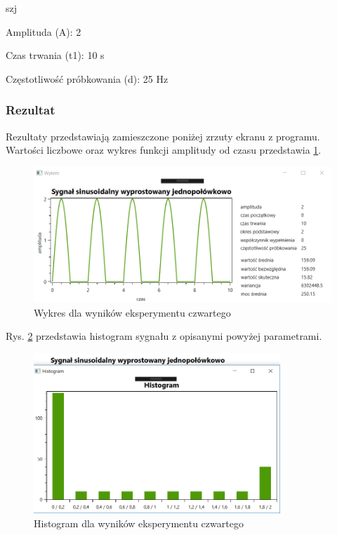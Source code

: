 \documentclass[12pt]{article}
\begin{document}
\begin{labeling}{szj}
\item [Amplituda (A):] 2
\item [Czas trwania (t1):] 10 s
\item [Częstotliwość próbkowania (d): ] 25 Hz
\end{labeling}

\subsubsection{Rezultat}

Rezultaty przedstawiają zamieszczone poniżej zrzuty ekranu z programu. Wartości liczbowe oraz wykres funkcji amplitudy od czasu przedstawia \ref{Wykres dla wyników eksperymentu czwartego}.
\begin{figure}[h!]
 \centering
 \includegraphics[width=12.3cm]{SinJednoP.PNG}
 \vspace{-0.3cm}
 \caption{Wykres dla wyników eksperymentu czwartego}
 \label{Wykres dla wyników eksperymentu czwartego}
\end{figure}

\newpage
Rys. \ref{Histogram dla wyników eksperymentu czwartego} przedstawia histogram sygnału z opisanymi powyżej parametrami. 
\begin{figure}[h!]
 \centering
 \includegraphics[width=9.3cm]{SinJednoPHist.PNG}
 \vspace{-0.3cm}
 \caption{Histogram dla wyników eksperymentu czwartego}
 \label{Histogram dla wyników eksperymentu czwartego}
\end{figure}
\end{document}
